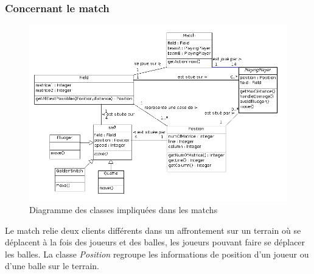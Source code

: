 \documentclass[a4paper,titlepage]{scrreprt}
\begin{document}
\begin{itemize}
  \subsubsection{Concernant le match}
    \begin{figure}[H]
    \center
    \includegraphics[scale=0.4]{uml/class/Diagrammedeclassesmatch.png}
    \caption{Diagramme des classes impliquées dans les matchs}
    \end{figure}	
    Le match relie deux clients différents dans un affrontement sur un \gls{terrain} 
    où se déplacent à la fois des joueurs et des balles, les joueurs pouvant faire se déplacer les balles. La classe \emph{Position} regroupe les informations de position d'un joueur ou d'une balle sur le terrain.

\end{itemize}
\end{document}
